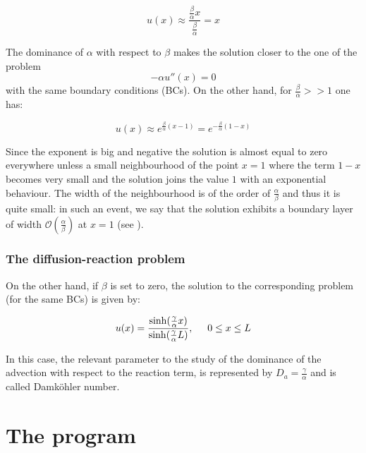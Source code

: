 \documentclass[11pt]{article}
\theoremstyle{theorem}
\theoremstyle{definition}
\begin{document}
\begin{equation}
	\label{key:AD-smallP}
	u(x)\approx\frac{\frac{\beta}{\alpha}x}{\frac{\beta}{\alpha}}=x
\end{equation}

The dominance of $\alpha$ with respect to $\beta$ makes the solution closer to the one of the problem
$$-\alpha u''(x)=0$$
with the same boundary conditions (BCs). On the other hand, for $\frac{\beta}{\alpha}>>1$ one has:

\begin{equation}
\label{key:AD-bigP}
u(x)\approx e^{\frac{\beta}{\alpha}(x-1)}=e^{-\frac{\beta}{\alpha}(1-x)}
\end{equation}

Since the exponent is big and negative the solution is almost equal to zero everywhere unless a small neighbourhood of the point $x=1$ where the term $ 1-x $ becomes very small and the solution joins the value $1$ with an exponential behaviour. The width of the neighbourhood is of the order of $\frac{\alpha}{\beta}$ and thus it is quite small: in such an event, we say that the solution exhibits a boundary layer of width $\mathcal{O}\left(\frac{\alpha}{\beta}\right)$ at $x=1$ (see \cite{numerical-math}).

\subsubsection{The diffusion-reaction problem}
On the other hand, if $\beta$ is set to zero, the solution to the corresponding problem (for the same BCs) is given by:

\begin{equation}
	\label{eqn:DR-sol}
	u(x)=\frac{\sinh(\frac{\gamma}{\alpha}x)}{\sinh(\frac{\gamma}{\alpha}L)},\hspace{5mm} 0\le x\le L
\end{equation}

In this case, the relevant parameter to the study of the dominance of the advection with respect to the reaction term, is represented by $D_a=\frac{\gamma}{\alpha}$ and is called Damk\"{o}hler number.\\

\section{The program}
\end{document}
